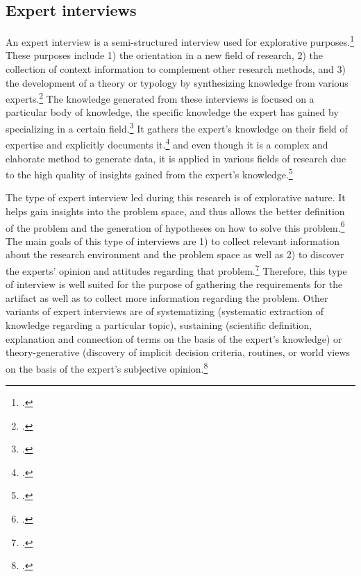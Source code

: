 \subsection{Expert interviews}
An expert interview is a semi-structured interview used for explorative purposes.\footcites[Cf.][p.179]{Flickintroductionqualitativeresearch2009}[cf.][p.465]{MeuserExperteninterviewkonzeptionelleGrundlagen2009}[cf.][p.31]{BognerInterviewsmitExperten2014} These purposes include 1) the orientation in a new field of research, 2) the collection of context information to complement other research methods, and 3) the development of a theory or typology by synthesizing knowledge from various experts.\footcite[Cf.][p.180]{Flickintroductionqualitativeresearch2009} The knowledge generated from these interviews is focused on a particular body of knowledge, the specific knowledge the expert has gained by specializing in a certain field.\footcites[Cf.][p.423]{BuberQualitativeMarktforschungKonzepte2007}[cf.][p.450]{PfadenhauerExperteninterviewGesprachauf2007} It gathers the expert's knowledge on their field of expertise and explicitly documents it.\footcites[Cf.][p.466]{MeuserExperteninterviewkonzeptionelleGrundlagen2009}[cf.][p.451]{PfadenhauerExperteninterviewGesprachauf2007}[cf.][p.172]{HickeyElicitationtechniqueselection2003} and even though it is a complex and elaborate method to generate data, it is applied in various fields of research due to the high quality of insights gained from the expert's knowledge.\footcites[Cf.][p.459]{PfadenhauerExperteninterviewGesprachauf2007}[cf.][p.442]{MeuserExpertInneninterviewsvielfacherprobt1991}[cf.][p.424]{BuberQualitativeMarktforschungKonzepte2007} 

The type of expert interview led during this research is of explorative nature. It helps gain insights into the problem space, and thus allows the better definition of the problem and the generation of hypotheses on how to solve this problem.\footcite[Cf.][p.28]{BognerInterviewsmitExperten2014} The main goals of this type of interviews are 1) to collect relevant information about the research environment and the problem space as well as 2) to discover the experts' opinion and attitudes regarding that problem.\footcite[Cf.][pp.28/29]{BognerInterviewsmitExperten2014} Therefore, this type of interview is well suited for the purpose of gathering the requirements for the artifact as well as to collect more information regarding the problem. Other variants of expert interviews are of systematizing (systematic extraction of knowledge regarding a particular topic), sustaining (scientific definition, explanation and connection of terms on the basis of the expert's knowledge) or theory-generative (discovery of implicit decision criteria, routines, or world views on the basis of the expert's subjective opinion.\footcites[Cf.][pp.27-30]{BognerInterviewsmitExperten2014}[cf.][p.421]{AghamanoukjanQualitativeInterviews2007}[cf.][p.180]{Flickintroductionqualitativeresearch2009}

